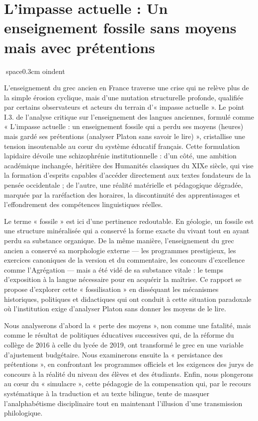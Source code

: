

\section{L'impasse actuelle : Un enseignement fossile sans moyens mais avec prétentions}
space{0.3cm}
oindent

L'enseignement du grec ancien en France traverse une crise qui ne relève plus de la simple érosion
cyclique, mais d'une mutation structurelle profonde, qualifiée par certains observateurs et acteurs
du terrain d'« impasse actuelle ». Le point I.3.\cite{I-3-3-ref3} de l'analyse critique sur
l'enseignement des langues anciennes, formulé comme « L'impasse actuelle : un enseignement fossile
qui a perdu ses moyens (heures) mais gardé ses prétentions (analyser Platon sans savoir le lire) »,
cristallise une tension insoutenable au cœur du système éducatif français. Cette formulation
lapidaire dévoile une schizophrénie institutionnelle : d'un côté, une ambition académique inchangée,
héritière des Humanités classiques du XIXe siècle, qui vise la formation d'esprits capables
d'accéder directement aux textes fondateurs de la pensée occidentale ; de l'autre, une réalité
matérielle et pédagogique dégradée, marquée par la raréfaction des horaires, la discontinuité des
apprentissages et l'effondrement des compétences linguistiques réelles.

Le terme « fossile » est ici d'une pertinence redoutable. En géologie, un fossile est une structure
minéralisée qui a conservé la forme exacte du vivant tout en ayant perdu sa substance organique. De
la même manière, l'enseignement du grec ancien a conservé sa morphologie externe — les programmes
prestigieux, les exercices canoniques de la version et du commentaire, les concours d'excellence
comme l'Agrégation — mais a été vidé de sa substance vitale : le temps d'exposition à la langue
nécessaire pour en acquérir la maîtrise. Ce rapport se propose d'explorer cette « fossilisation » en
disséquant les mécanismes historiques, politiques et didactiques qui ont conduit à cette situation
paradoxale où l'institution exige d'analyser Platon sans donner les moyens de le lire.

Nous analyserons d'abord la « perte des moyens », non comme une fatalité, mais comme le résultat de
politiques éducatives successives qui, de la réforme du collège de 2016 à celle du lycée de 2019,
ont transformé le grec en une variable d'ajustement budgétaire. Nous examinerons ensuite la «
persistance des prétentions », en confrontant les programmes officiels et les exigences des jurys de
concours à la réalité du niveau des élèves et des étudiants. Enfin, nous plongerons au cœur du «
simulacre », cette pédagogie de la compensation qui, par le recours systématique à la traduction et
au texte bilingue, tente de masquer l'analphabétisme disciplinaire tout en maintenant l'illusion
d'une transmission philologique.



